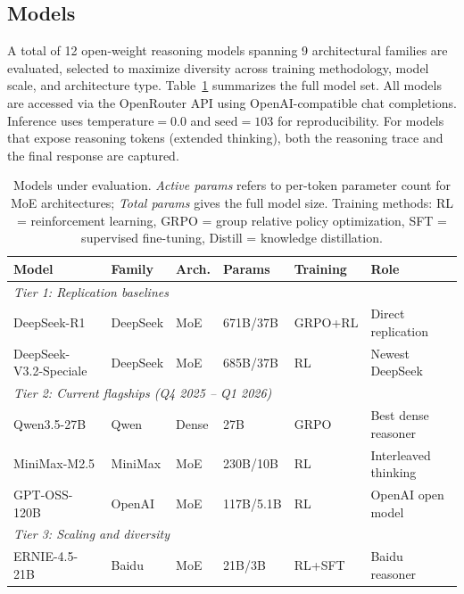 \subsection{Models}
\label{sec:models}

A total of 12 open-weight reasoning models spanning 9 architectural families are
evaluated, selected to maximize diversity across training methodology, model
scale, and architecture type. Table~\ref{tab:models} summarizes the full model
set. All models are accessed via the OpenRouter API using OpenAI-compatible chat
completions. Inference uses $\text{temperature}=0.0$ and $\text{seed}=103$ for
reproducibility. For models that expose reasoning tokens (extended thinking),
both the reasoning trace and the final response are captured.

\begin{table}[H]
  \centering
  \caption{Models under evaluation. \emph{Active params} refers to per-token
  parameter count for MoE architectures; \emph{Total params} gives the full
  model size. Training methods: RL = reinforcement learning,
  GRPO = group relative policy optimization,
  SFT = supervised fine-tuning, Distill = knowledge distillation.}
  \label{tab:models}
  \small
  \begin{tabular}{llllll}
    \toprule
    \textbf{Model} & \textbf{Family} & \textbf{Arch.} & \textbf{Params} & \textbf{Training} & \textbf{Role} \\
    \midrule
    \multicolumn{6}{l}{\emph{Tier 1: Replication baselines}} \\
    DeepSeek-R1              & DeepSeek  & MoE   & 671B/37B   & GRPO+RL     & Direct replication \\
    DeepSeek-V3.2-Speciale   & DeepSeek  & MoE   & 685B/37B   & RL          & Newest DeepSeek \\
    \midrule
    \multicolumn{6}{l}{\emph{Tier 2: Current flagships (Q4 2025 -- Q1 2026)}} \\
    Qwen3.5-27B              & Qwen      & Dense & 27B        & GRPO        & Best dense reasoner \\
    MiniMax-M2.5             & MiniMax   & MoE   & 230B/10B   & RL          & Interleaved thinking \\
    GPT-OSS-120B             & OpenAI    & MoE   & 117B/5.1B  & RL          & OpenAI open model \\
    \midrule
    \multicolumn{6}{l}{\emph{Tier 3: Scaling and diversity}} \\
    ERNIE-4.5-21B            & Baidu     & MoE   & 21B/3B     & RL+SFT      & Baidu reasoner \\

\end{tabular}
\end{table}
